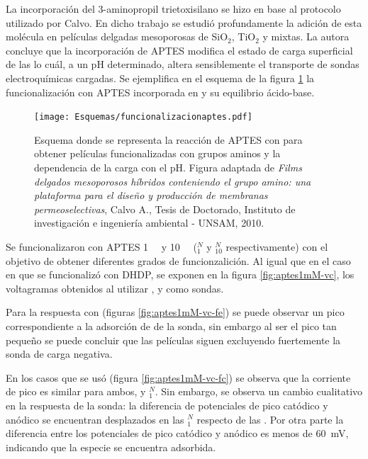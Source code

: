 			La incorporación del 3-aminopropil trietoxisilano se hizo en base al protocolo utilizado por Calvo\cite{Calvo20210}. En dicho trabajo se estudió profundamente la adición de esta molécula en películas delgadas mesoporosas de SiO$_2$, TiO$_2$ y mixtas. La autora concluye que la incorporación de APTES modifica el estado de carga superficial de las \pdm\space lo cuál, a un pH determinado, altera sensiblemente el transporte de sondas electroquímicas cargadas. Se ejemplifica en el esquema de la figura \ref{esq:aptes-esquema} la funcionalización con APTES incorporada en \pdmZ\space y su equilibrio ácido-base.

				 \begin{figure}[ht!]	
					\centering
			 	    \texttt{[image: Esquemas/funcionalizacionaptes.pdf]}
			        \caption[Funcionalización con APTES 1mM]{Esquema donde se representa la reacción de APTES con \pdmZ\space para obtener películas funcionalizadas con grupos aminos y la dependencia de la carga con el pH. Figura adaptada de \textit{Films delgados mesoporosos híbridos conteniendo el grupo amino: una plataforma para el diseño y producción de membranas permeoselectivas}, Calvo A., Tesis de Doctorado, Instituto de investigación e ingeniería ambiental - UNSAM, 2010.\cite{Calvo20210}}
			        \label{esq:aptes-esquema}
			      	\end{figure}

			\vspace*{3mm}Se funcionalizaron \pdmZ\space con APTES \SI{1}{\milli\Molar} y \SI{10}{\milli\Molar} (\pdmZ$^N_{1}$ y \pdmZ$^N_{10}$ respectivamente) con el objetivo de obtener diferentes grados de funcionzalición\cite{Calvo20210,Angelome2008,Fuertes2010}. Al igual que en el caso en que se funcionalizó con DHDP, se exponen en la figura \ref{fig:aptes1mM-vc}, los voltagramas obtenidos al utilizar \fe, \fc\space y \ru\space como sondas.

			Para la respuesta con \fe\space (figuras \ref{fig:aptes1mM-vc-fe}) se puede observar un pico correspondiente a la adsorción de de la sonda, sin embargo al ser el pico tan pequeño se puede concluir que las películas siguen excluyendo fuertemente la sonda de carga negativa.

			En los casos que se usó \fc\space (figura \ref{fig:aptes1mM-vc-fc}) se observa que la corriente de pico es similar para ambos, \pdmZ\space y \pdmZ$^N_1$. Sin embargo, se observa un cambio cualitativo en la respuesta de la sonda: la diferencia de potenciales de pico catódico y anódico se encuentran desplazados en las \pdmZ$^N_1$ respecto de las \pdmZ. Por otra parte la diferencia entre los potenciales de pico catódico y anódico es menos de \SI{60}{\milli\volt}, indicando que la especie se encuentra adsorbida. 

